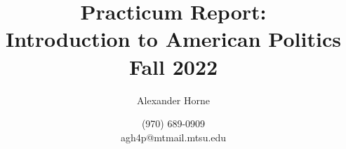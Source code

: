 \documentclass[letterpaper,12pt,twoside]{article} %
\title{\Huge Practicum Report: \\ \huge Introduction to American Politics \\ Fall 2022}
\author{\large Alexander Horne}
\date{(970) 689-0909 \\ agh4p@mtmail.mtsu.edu} %
\begin{document}
\begin{titlepage}
  \maketitle
\vfill


\end{titlepage}



\end{document}
